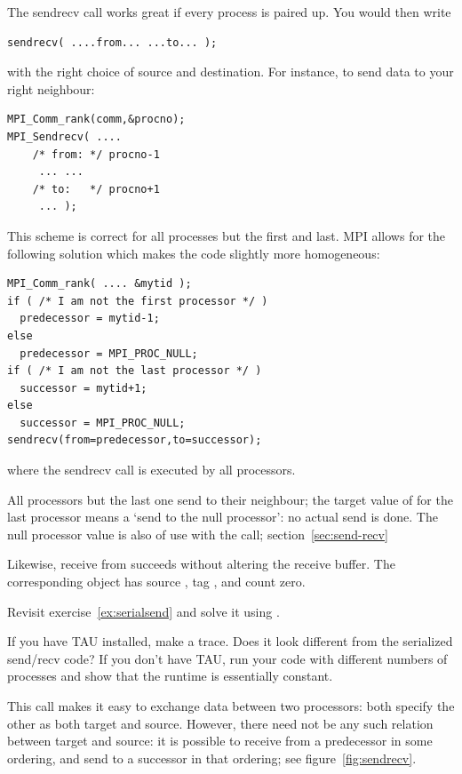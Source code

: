 The sendrecv call works great if every process is paired up.
You would then write
\begin{lstlisting}
sendrecv( ....from... ...to... );
\end{lstlisting}
with the right choice of source and destination. For instance, to send
data to your right neighbour:
\begin{lstlisting}
MPI_Comm_rank(comm,&procno);
MPI_Sendrecv( .... 
    /* from: */ procno-1
     ... ... 
    /* to:   */ procno+1
     ... );
\end{lstlisting}
This scheme is correct for all processes but the first and last. 
MPI allows for the following solution which makes the code slightly 
more homogeneous:
\begin{lstlisting}
MPI_Comm_rank( .... &mytid );
if ( /* I am not the first processor */ )
  predecessor = mytid-1;
else
  predecessor = MPI_PROC_NULL;
if ( /* I am not the last processor */ )
  successor = mytid+1;
else
  successor = MPI_PROC_NULL;
sendrecv(from=predecessor,to=successor);
\end{lstlisting}
where the sendrecv call is executed by all processors.

All processors but the last one send to their neighbour; the target
value of  for
the last processor means a `send to the null processor': no actual
send is done. 
The null processor value is also of use with the
 call; section~\ref{sec:send-recv}

Likewise, receive from  succeeds without
altering the receive buffer.  The corresponding
 object has source
, tag , and
count zero.

\begin{exercise}
  \label{ex:rightsendrecv}
  Revisit exercise~\ref{ex:serialsend} and solve it using
  .

  If you have TAU installed, make a trace. Does it look different
  from the serialized send/recv code? If you don't have TAU, run your
  code with different numbers of processes and show that the runtime
  is essentially constant.
\end{exercise}

This call makes it easy to exchange data between two processors: both
specify the other as both target and source. However, there need not
be any such relation between target and source: it is possible to
receive from a predecessor in some ordering, and send to a successor
in that ordering; see figure~\ref{fig:sendrecv}.

